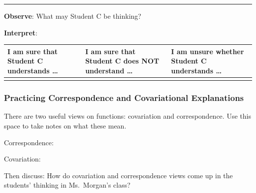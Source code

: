 \documentclass[11pt]{article}
\newcommand{\handout}{\subsubsection}
\theoremstyle{definition}
\begin{document}
\vspace*{2pt}
\hrule
\vspace*{2pt}

{\bf Observe}: What may Student C be thinking?

{\bf Interpret}: 

\begin{tabular}{C{1.75in}|C{1.75in}|C{1.75in}}
I am sure that Student C understands \dots  & I am sure that Student C
does NOT understand \dots & I am unsure whether
Student C understands \dots  \\ \hline
& & \vspace*{1.75in}\\
\end{tabular}

\newpage
\handout{Practicing Correspondence and Covariational Explanations}

There are two useful views on functions: covariation and correspondence. Use this space to take notes on what these mean.

Correspondence: 

Covariation: 

Then discuss: How do covariation and correspondence views come up in the students' thinking in Ms.~Morgan's class?

\newpage
\end{document}

